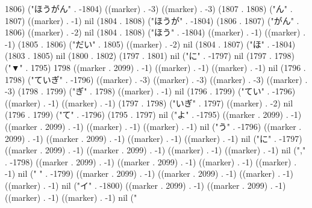 1806) ("ほうがん" . -1804) ((marker) . -3) ((marker) . -3) (1807 . 1808) ("ん" . 1807) ((marker) . -1) nil (1804 . 1808) ("ほうが" . -1804) (1806 . 1807) ("がん" . 1806) ((marker) . -2) nil (1804 . 1808) ("ほう" . -1804) ((marker) . -1) ((marker) . -1) (1805 . 1806) ("だい" . 1805) ((marker) . -2) nil (1804 . 1807) ("ほ" . -1804) (1803 . 1805) nil (1800 . 1802) (1797 . 1801) nil ("に" . -1797) nil (1797 . 1798) ("▼" . 1795) 1798 ((marker . 2099) . -1) ((marker) . -1) ((marker) . -1) nil (1796 . 1798) ("ていぎ" . -1796) ((marker) . -3) ((marker) . -3) ((marker) . -3) ((marker) . -3) (1798 . 1799) ("ぎ" . 1798) ((marker) . -1) nil (1796 . 1799) ("てい" . -1796) ((marker) . -1) ((marker) . -1) (1797 . 1798) ("いぎ" . 1797) ((marker) . -2) nil (1796 . 1799) ("て" . -1796) (1795 . 1797) nil ("よ" . -1795) ((marker . 2099) . -1) ((marker . 2099) . -1) ((marker) . -1) ((marker) . -1) nil ("う" . -1796) ((marker . 2099) . -1) ((marker . 2099) . -1) ((marker) . -1) ((marker) . -1) nil ("に" . -1797) ((marker . 2099) . -1) ((marker . 2099) . -1) ((marker) . -1) ((marker) . -1) nil ("," . -1798) ((marker . 2099) . -1) ((marker . 2099) . -1) ((marker) . -1) ((marker) . -1) nil (" " . -1799) ((marker . 2099) . -1) ((marker . 2099) . -1) ((marker) . -1) ((marker) . -1) nil ("イ" . -1800) ((marker . 2099) . -1) ((marker . 2099) . -1) ((marker) . -1) ((marker) . -1) nil ("
